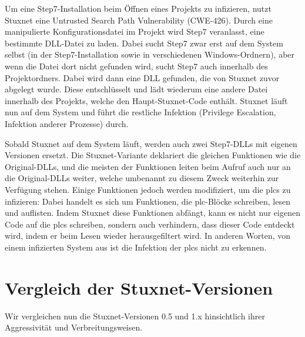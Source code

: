 \documentclass[a4paper]{article}
\begin{document}
Um eine Step7-Installation beim Öffnen eines Projekts zu infizieren, nutzt Stuxnet eine Untrusted Search Path Vulnerability (CWE-426\cite{cwe_searchpath}).
Durch eine manipulierte Konfigurationsdatei im Projekt wird Step7 veranlasst, eine bestimmte DLL-Datei zu laden.
Dabei sucht Step7 zwar erst auf dem System selbst (in der Step7-Installation sowie in verschiedenen Windows-Ordnern), %
aber wenn die Datei dort nicht gefunden wird, sucht Step7 auch innerhalb des Pro\-jekt\-ord\-ners.
Dabei wird dann eine DLL gefunden, die von Stuxnet zuvor abgelegt wurde.
Diese entschlüsselt und lädt wiederum eine andere Datei innerhalb des Projekts, welche den Haupt-Stuxnet-Code enthält.
Stuxnet läuft nun auf dem System und führt die restliche Infektion (Privilege Escalation, Infektion anderer Prozesse) durch.

Sobald Stuxnet auf dem System läuft, werden auch zwei Step7-DLLs mit eigenen Versionen ersetzt.
Die Stuxnet-Variante deklariert die gleichen Funktionen wie die Original-DLLs,
und die meisten der Funktionen leiten beim Aufruf auch nur an die Original-DLLs weiter,
welche umbenannt zu diesem Zweck weiterhin zur Verfügung stehen.
Einige Funktionen jedoch werden modifiziert, um die \glspl{plc} zu infizieren:
Dabei handelt es sich um Funktionen, die \gls{plc}-Blöcke schreiben, lesen und auflisten.
Indem Stuxnet diese Funktionen abfängt, kann es nicht nur eigenen Code auf die \glspl{plc} schreiben,
sondern auch verhindern, dass dieser Code entdeckt wird, indem er beim Lesen wieder herausgefiltert wird.
In anderen Worten, von einem infizierten System aus ist die Infektion der \glspl{plc} nicht zu erkennen.


\section{Vergleich der Stuxnet-Versionen}

Wir vergleichen nun die Stuxnet-Versionen 0.5 und 1.x hinsichtlich ihrer Aggressivität und Verbreitungsweisen.
\end{document}
